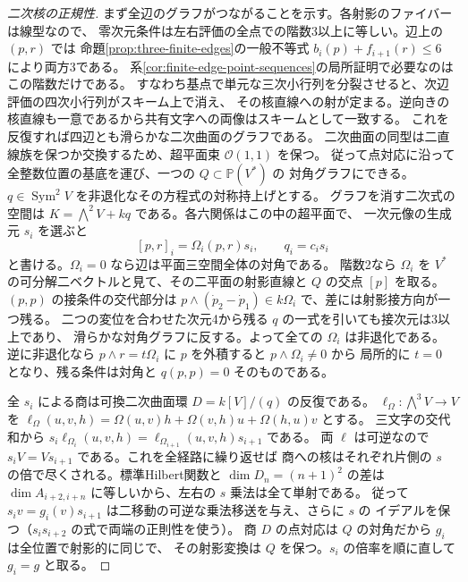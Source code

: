 \begin{proof}[二次核の正規性]
まず全辺のグラフがつながることを示す。各射影のファイバーは線型なので、
零次元条件は左右評価の全点での階数3以上に等しい。辺上の $(p,r)$ では
命題\ref{prop:three-finite-edges}の一般不等式 $b_i(p)+f_{i+1}(r)\le6$ により両方3である。
系\ref{cor:finite-edge-point-sequences}の局所証明で必要なのはこの階数だけである。
すなわち基点で単元な三次小行列を分裂させると、次辺評価の四次小行列がスキーム上で消え、
その核直線への射が定まる。逆向きの核直線も一意であるから共有文字への両像はスキームとして一致する。
これを反復すれば四辺とも滑らかな二次曲面のグラフである。
二次曲面の同型は二直線族を保つか交換するため、超平面束 $\mathcal O(1,1)$ を保つ。
従って点対応に沿って全整数位置の基底を運び、一つの $Q\subset\mathbb P(V^*)$ の
対角グラフにできる。$q\in\operatorname{Sym}^2 V$ を非退化なその方程式の対称持上げとする。
グラフを消す二次式の空間は $K=\bigwedge^2 V+kq$ である。各六関係はこの中の超平面で、
一次元像の生成元 $s_i$ を選ぶと
\[
 [p,r]_i=\Omega_i(p,r)s_i,\qquad q_i=c_i s_i
\]
と書ける。$\Omega_i=0$ なら辺は平面三空間全体の対角である。
階数2なら $\Omega_i$ を $V^*$ の可分解二ベクトルと見て、その二平面の射影直線と
$Q$ の交点 $[p]$ を取る。$(p,p)$ の接条件の交代部分は
$p\wedge(\dot p_2-\dot p_1)\in k\Omega_i$ で、差には射影接方向が一つ残る。
二つの変位を合わせた次元4から残る $q$ の一式を引いても接次元は3以上であり、
滑らかな対角グラフに反する。よって全ての $\Omega_i$ は非退化である。
逆に非退化なら $p\wedge r=t\Omega_i$ に $p$ を外積すると $p\wedge\Omega_i\ne0$ から
局所的に $t=0$ となり、残る条件は対角と $q(p,p)=0$ そのものである。

全 $s_i$ による商は可換二次曲面環 $D=k[V]/(q)$ の反復である。
$\ell_\Omega:\bigwedge^3 V\to V$ を
$\ell_\Omega(u,v,h)=\Omega(u,v)h+\Omega(v,h)u+\Omega(h,u)v$ とする。
三文字の交代和から
$s_i\ell_{\Omega_i}(u,v,h)=\ell_{\Omega_{i+1}}(u,v,h)s_{i+1}$ である。
両 $\ell$ は可逆なので $s_i V=V s_{i+1}$ である。これを全経路に繰り返せば
商への核はそれぞれ片側の $s$ の倍で尽くされる。標準Hilbert関数と
$\dim D_n=(n+1)^2$ の差は $\dim A_{i+2,i+n}$ に等しいから、左右の $s$ 乗法は全て単射である。
従って $s_i v=g_i(v)s_{i+1}$ は二移動の可逆な乗法移送を与え、さらに $s$ の
イデアルを保つ（$s_i s_{i+2}$ の式で両端の正則性を使う）。
商 $D$ の点対応は $Q$ の対角だから $g_i$ は全位置で射影的に同じで、
その射影変換は $Q$ を保つ。$s_i$ の倍率を順に直して $g_i=g$ と取る。
\end{proof}

